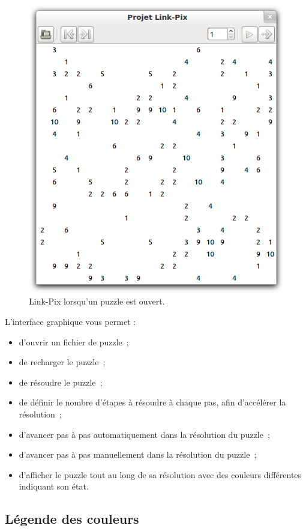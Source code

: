 \begin{figure}[h!]
      \centering
      \includegraphics[scale=0.5]{gui-3}
      \caption{Link-Pix lorsqu'un puzzle est ouvert.}
\end{figure}

L'interface graphique vous permet :
\begin{itemize}
	\item d'ouvrir un fichier de puzzle~;
	\item de recharger le puzzle~;
	\item de résoudre le puzzle~;
	\item de définir le nombre d'étapes à résoudre à chaque pas, afin d'accélérer la résolution~;
	\item d'avancer pas à pas automatiquement dans la résolution du puzzle~;
	\item d'avancer pas à pas manuellement dans la résolution du puzzle~;
	\item d'afficher le puzzle tout au long de sa résolution avec des couleurs différentes indiquant son état.
\end{itemize}

\subsection{Légende des couleurs}


